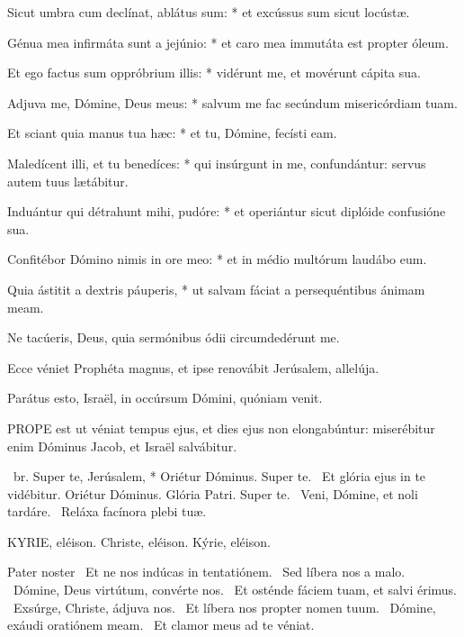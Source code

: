 Sicut umbra cum declínat, ablátus sum: * et excússus sum sicut locústæ.

Génua mea infirmáta sunt a jejúnio: * et caro mea immutáta est propter óleum.

Et ego factus sum oppróbrium illis: * vidérunt me, et movérunt cápita sua.

Adjuva me, Dómine, Deus meus: * salvum me fac secúndum misericórdiam tuam.

Et sciant quia manus tua hæc: * et tu, Dómine, fecísti eam.

Maledícent illi, et tu benedíces: * qui insúrgunt in me, confundántur: servus autem tuus lætábitur.

Induántur qui détrahunt mihi, pudóre: * et operiántur sicut diplóide confusióne sua.

Confitébor Dómino nimis in ore meo: * et in médio multórum laudábo eum.

Quia ástitit a dextris páuperis, * ut salvam fáciat a persequéntibus ánimam meam.

  Ne tacúeris, Deus, quia sermónibus ódii circumdedérunt me.


  Ecce véniet Prophéta magnus, et ipse renovábit Jerúsalem, allelúja.

  Parátus esto, Israël, in occúrsum Dómini, quóniam venit.


\lettrine[lines=2]{P}{ROPE} est ut véniat tempus ejus, et dies ejus non elongabúntur: miserébitur enim Dóminus Jacob, et Israël salvábitur.

\R\ br. Super te, Jerúsalem, * Oriétur Dóminus. Super te. \V\ Et glória ejus in te vidébitur. Oriétur Dóminus. Glória Patri. Super te. \V\ Veni, Dómine, et noli tardáre. \R\ Reláxa facínora plebi tuæ.


KYRIE, eléison. Christe, eléison. Kýrie, eléison.

Pater noster  \V\ Et ne nos indúcas in tentatiónem. \R\ Sed líbera nos a malo. \V\ Dómine, Deus virtútum, convérte nos. \R\ Et osténde fáciem tuam, et salvi érimus. \V\ Exsúrge, Christe, ádjuva nos. \R\ Et líbera nos propter nomen tuum. \V\ Dómine, exáudi oratiónem meam. \R\ Et clamor meus ad te véniat.

